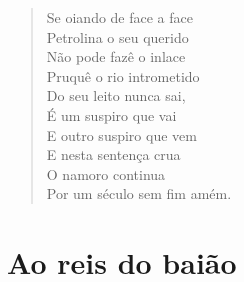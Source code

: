 \begin{verse}
Se oiando de face a face\\
Petrolina o seu querido\\
Não pode fazê o inlace\\
Pruquê o rio intrometido\\
Do seu leito nunca sai,\\
É um suspiro que vai\\
E outro suspiro que vem\\
E nesta sentença crua\\
O namoro continua\\
Por um século sem fim amém.
\end{verse}

\chapter{Ao reis do baião}

